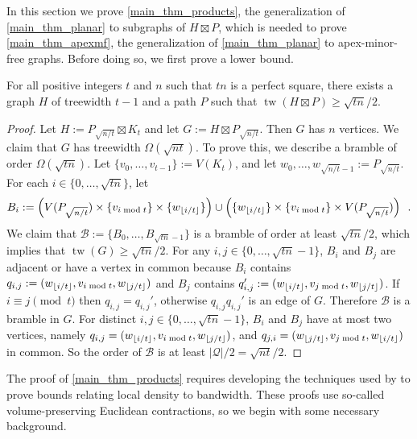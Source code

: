 \documentclass{patmorin}
\renewcommand{\ge}{\geqslant}
\DeclareMathOperator{\tw}{tw}
\begin{document}
In this section we prove \cref{main_thm_products}, the generalization of \cref{main_thm_planar} to subgraphs of $H\boxtimes P$, which is needed to prove \cref{main_thm_apexmf}, the generalization of \cref{main_thm_planar} to apex-minor-free graphs.  
Before doing so, we first prove a lower bound.
\begin{thm}
  For all positive integers $t$ and $n$ such that $tn$ is a perfect square, there exists a graph $H$ of treewidth $t-1$ and a path $P$ such that $\tw(H\boxtimes P)\ge \sqrt{tn}/2$.
\end{thm}

\begin{proof}
  Let $H:=P_{\sqrt{n/t}}\boxtimes K_t$ and let $G:=H\boxtimes P_{\sqrt{n/t}}$.  Then $G$ has $n$ vertices.  We claim that $G$ has treewidth $\Omega(\sqrt{nt})$.  To prove this, we describe a bramble of order $\Omega(\sqrt{tn})$. Let $\{v_0,\ldots,v_{t-1}\}:=V(K_t)$, and let $w_0,\ldots,w_{\sqrt{n/t}-1}:=P_{\sqrt{n/t}}$.  For each $i\in\{0,\ldots,\sqrt{tn}\}$, let
\[
   B_i:=\left(V(P_{\sqrt{n/t}})\times\{v_{i\bmod t}\}\times\{w_{{\lfloor i/t \rfloor}}\}\right)
   \cup \left(\{w_{{\lfloor i/t \rfloor}}\}\times\{v_{i\bmod t}\}\times V(P_{\sqrt{n/t}})\right) \enspace .
\]
We claim that $\mathcal{B}:=\{B_0,\ldots,B_{\sqrt{tn}-1}\}$ is a bramble of order at least $\sqrt{tn}/2$, which implies that $\tw(G)\ge\sqrt{tn}/2$.  For any $i,j\in\{0,\ldots,\sqrt{tn}-1\}$, $B_i$ and $B_j$ are adjacent or have a vertex in common because $B_i$ contains $q_{i,j}:=(w_{{\lfloor i/t \rfloor}},v_{i\bmod t},w_{{\lfloor j/t \rfloor}})$ and $B_j$ contains $q_{i,j}':=(w_{{\lfloor i/t \rfloor}},v_{j\bmod t},w_{{\lfloor j/t \rfloor}})$.  If $i\equiv j\pmod t$ then $q_{i,j}=q_{i,j}'$, otherwise $q_{i,j}q_{i,j}'$ is an edge of $G$.  Therefore $\mathcal{B}$ is a bramble in $G$.  For distinct $i,j\in\{0,\ldots,\sqrt{tn}-1\}$, $B_i$ and $B_j$ have at most two vertices, namely $q_{i,j}=(w_{{\lfloor i/t \rfloor}},v_{i\bmod t},w_{{\lfloor j/t \rfloor}})$, and $q_{j,i}=(w_{{\lfloor j/t \rfloor}},v_{j\bmod t},w_{{\lfloor i/t \rfloor}})$ in common. So the order of $\mathcal{B}$ is at least $|\mathcal{Q}|/2=\sqrt{nt}/2$.
\end{proof}

The proof of \cref{main_thm_products} requires developing the techniques used by \citet{feige:approximating,rao:small} to prove bounds relating local density to bandwidth. These proofs use so-called volume-preserving Euclidean contractions, so we begin with some necessary background.
\end{document}
